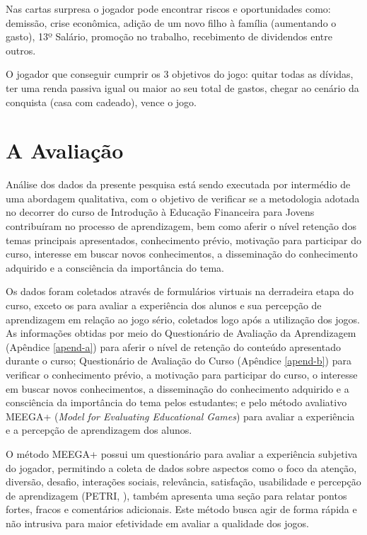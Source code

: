 Nas cartas surpresa o jogador pode encontrar riscos e oportunidades como: demissão, crise econômica, adição de um novo filho à família (aumentando o gasto), 13º Salário, promoção no trabalho, recebimento de dividendos entre outros.

O jogador que conseguir cumprir os 3 objetivos do jogo: quitar todas as dívidas, ter uma renda passiva igual ou maior ao seu total de gastos, chegar ao cenário da conquista (casa com cadeado), vence o jogo.

\section{A Avaliação}
Análise dos dados da presente pesquisa está sendo executada por intermédio de uma abordagem qualitativa, com o objetivo de verificar se a metodologia adotada no decorrer do curso de Introdução à Educação Financeira para Jovens contribuíram no processo de aprendizagem, bem como aferir o nível retenção dos temas principais apresentados, conhecimento prévio, motivação para participar do curso, interesse em buscar novos conhecimentos, a disseminação do conhecimento adquirido e a consciência da importância do tema.

Os dados foram coletados através de formulários virtuais na derradeira etapa do curso, exceto os para avaliar a experiência dos alunos e sua percepção de aprendizagem em relação ao jogo sério, coletados logo após a utilização dos jogos. As informações obtidas por meio do Questionário de Avaliação da Aprendizagem (Apêndice \ref{apend-a}) para aferir o nível de retenção do conteúdo apresentado durante o curso; Questionário de Avaliação do Curso (Apêndice \ref{apend-b}) para verificar o conhecimento prévio, a motivação para participar do curso, o interesse em buscar novos conhecimentos, a disseminação do conhecimento adquirido e a consciência da importância do tema pelos estudantes; e pelo método avaliativo MEEGA+ (\textit{Model for Evaluating Educational Games}) para avaliar a experiência e a percepção de aprendizagem dos alunos.

O método MEEGA+ possui um questionário para avaliar a experiência subjetiva do jogador, permitindo a coleta de dados sobre aspectos como o foco da atenção, diversão, desafio, interações sociais, relevância, satisfação, usabilidade e percepção de aprendizagem (PETRI, \citeyear{petri2017}), também apresenta uma seção para relatar pontos fortes, fracos e comentários adicionais. Este método busca agir de forma rápida e não intrusiva para maior efetividade em avaliar a qualidade dos jogos.

